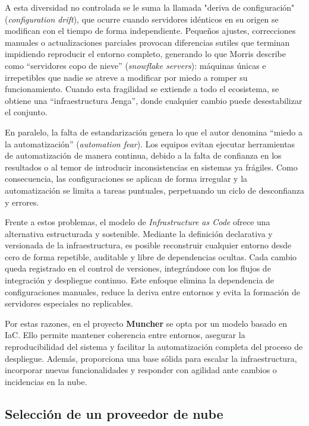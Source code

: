 A esta diversidad no controlada se le suma la llamada "deriva de configuración" (\textit{configuration drift}), que ocurre cuando servidores idénticos en su origen se modifican con el tiempo de forma independiente. Pequeños ajustes, correcciones manuales o actualizaciones parciales provocan diferencias sutiles que terminan impidiendo reproducir el entorno completo, generando lo que Morris describe como “servidores copo de nieve” (\textit{snowflake servers}): máquinas únicas e irrepetibles que nadie se atreve a modificar por miedo a romper su funcionamiento. Cuando esta fragilidad se extiende a todo el ecosistema, se obtiene una “infraestructura Jenga”, donde cualquier cambio puede desestabilizar el conjunto.

En paralelo, la falta de estandarización genera lo que el autor denomina “miedo a la automatización” (\textit{automation fear}). Los equipos evitan ejecutar herramientas de automatización de manera continua, debido a la falta de confianza en los resultados o al temor de introducir inconsistencias en sistemas ya frágiles. Como consecuencia, las configuraciones se aplican de forma irregular y la automatización se limita a tareas puntuales, perpetuando un ciclo de desconfianza y errores.

Frente a estos problemas, el modelo de \textit{Infrastructure as Code} ofrece una alternativa estructurada y sostenible. Mediante la definición declarativa y versionada de la infraestructura, es posible reconstruir cualquier entorno desde cero de forma repetible, auditable y libre de dependencias ocultas. Cada cambio queda registrado en el control de versiones, integrándose con los flujos de integración y despliegue continuo. Este enfoque elimina la dependencia de configuraciones manuales, reduce la deriva entre entornos y evita la formación de servidores especiales no replicables.

Por estas razones, en el proyecto \textbf{Muncher} se opta por un modelo basado en IaC. Ello permite mantener coherencia entre entornos, asegurar la reproducibilidad del sistema y facilitar la automatización completa del proceso de despliegue. Además, proporciona una base sólida para escalar la infraestructura, incorporar nuevas funcionalidades y responder con agilidad ante cambios o incidencias en la nube.

\subsection*{Selección de un proveedor de nube}

